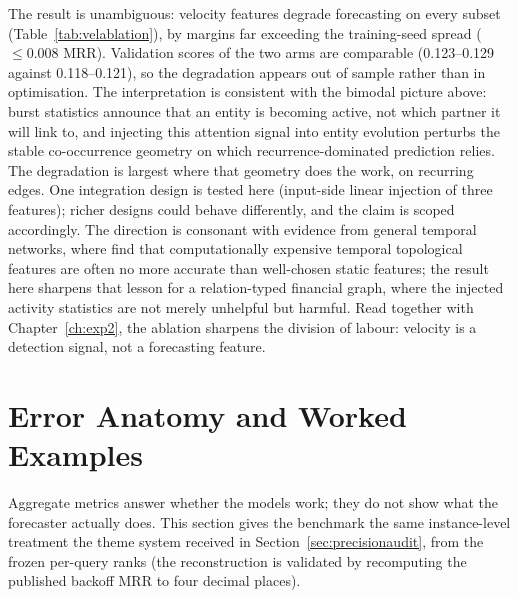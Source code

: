 \documentclass[a4paper,12pt]{report}
\begin{document}
\begin{table}[ht]
\centering
\caption{Velocity-feature ablation on the canonical deduplicated core
(three-seed mean MRR; paired per-query bootstrap gap with 95\% CI; gaps
are computed before rounding).}
\label{tab:velablation}
%
\end{table}

The result is unambiguous: velocity features degrade forecasting on
every subset (Table~\ref{tab:velablation}), by margins far exceeding the
training-seed spread ($\leq 0.008$ MRR). Validation scores of the two arms
are comparable (0.123--0.129 against 0.118--0.121), so the degradation appears
out of sample rather than in optimisation. The interpretation is consistent
with the bimodal picture above: burst statistics announce that an
entity is becoming active, not which partner it will link to, and
injecting this attention signal into entity evolution perturbs the stable
co-occurrence geometry on which recurrence-dominated prediction relies. The
degradation is largest where that geometry does the work, on
recurring edges. One integration design is tested here (input-side linear
injection of three features); richer designs could behave differently, and
the claim is scoped accordingly. The direction is consonant with
evidence from general temporal networks, where \citet{He2024Stacking}
find that computationally expensive temporal topological features are
often no more accurate than well-chosen static features; the result here
sharpens that lesson for a relation-typed financial graph, where the
injected activity statistics are not merely unhelpful but harmful. Read together with Chapter~\ref{ch:exp2},
the ablation sharpens the division of labour: velocity is a detection
signal, not a forecasting feature.

\section{Error Anatomy and Worked Examples}
\label{sec:erroranatomy}
Aggregate metrics answer whether the models work; they do not show what the
forecaster actually does. This section gives the benchmark the same
instance-level treatment the theme system received in
Section~\ref{sec:precisionaudit}, from the frozen per-query ranks (the
reconstruction is validated by recomputing the published backoff MRR to
four decimal places).
\end{document}
